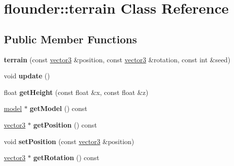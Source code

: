 \hypertarget{classflounder_1_1terrain}{}\section{flounder\+:\+:terrain Class Reference}
\label{classflounder_1_1terrain}
\subsection*{Public Member Functions}
\begin{DoxyCompactItemize}
\item 
\mbox{\label{classflounder_1_1terrain_aaabbb3d32c358579cf494cf57e2a9573}} 
{\bfseries terrain} (const \hyperlink{classflounder_1_1vector3}{vector3} \&position, const \hyperlink{classflounder_1_1vector3}{vector3} \&rotation, const int \&seed)
\item 
\mbox{\label{classflounder_1_1terrain_a9dda293c5f2b60d9b8cc487308f1cae9}} 
void {\bfseries update} ()
\item 
\mbox{\label{classflounder_1_1terrain_aa137c3336cb86a5831b238d1ba27d2dc}} 
float {\bfseries get\+Height} (const float \&x, const float \&z)
\item 
\mbox{\label{classflounder_1_1terrain_a4721a0ffb615a335abb9ea191dfb1a59}} 
\hyperlink{classflounder_1_1model}{model} $\ast$ {\bfseries get\+Model} () const
\item 
\mbox{\label{classflounder_1_1terrain_a6cf98377d607aa5c7659e491305f1513}} 
\hyperlink{classflounder_1_1vector3}{vector3} $\ast$ {\bfseries get\+Position} () const
\item 
\mbox{\label{classflounder_1_1terrain_ae2f558d3ce32ac247142b24f09e022f9}} 
void {\bfseries set\+Position} (const \hyperlink{classflounder_1_1vector3}{vector3} \&position)
\item 
\mbox{\label{classflounder_1_1terrain_afe2c6cdecdfb5bef2d4a237fc3009ae2}} 
\hyperlink{classflounder_1_1vector3}{vector3} $\ast$ {\bfseries get\+Rotation} () const
\item 

\end{DoxyCompactItemize}
